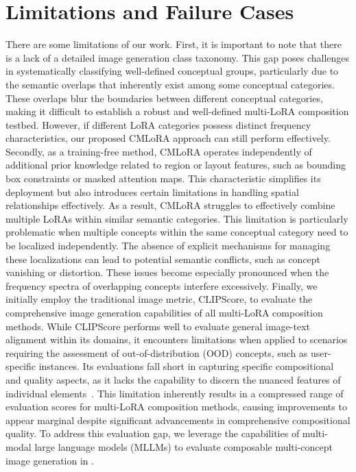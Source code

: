 \section{Limitations and Failure Cases}
\label{sec:limit}
There are some limitations of our work. First, it is important to note that there is a lack of a detailed image generation class taxonomy. This gap poses challenges in systematically classifying well-defined conceptual groups, particularly due to the semantic overlaps that inherently exist among some conceptual categories. These overlaps blur the boundaries between different conceptual categories, making it difficult to establish a robust and well-defined multi-LoRA composition testbed. However, if different LoRA categories possess distinct frequency characteristics, our proposed CMLoRA approach can still perform effectively.
Secondly, as a training-free method, CMLoRA operates independently of additional prior knowledge related to region or layout features, such as bounding box constraints or masked attention maps. This characteristic simplifies its deployment but also introduces certain limitations in handling spatial relationships effectively. As a result, CMLoRA struggles to effectively combine multiple LoRAs within similar semantic categories. This limitation is particularly problematic when multiple concepts within the same conceptual category need to be localized independently. The absence of explicit mechanisms for managing these localizations can lead to potential semantic conflicts, such as concept vanishing or distortion. These issues become especially pronounced when the frequency spectra of overlapping concepts interfere excessively.
Finally, we initially employ the traditional image metric, CLIPScore, to evaluate the comprehensive image generation capabilities of all multi-LoRA composition methods. While CLIPScore performs well to evaluate general image-text alignment within its domains, it encounters limitations when applied to scenarios requiring the assessment of out-of-distribution (OOD) concepts, such as user-specific instances. Its evaluations fall short in capturing specific compositional and quality aspects, as it lacks the capability to discern the nuanced features of individual elements~\citep{multilora}. This limitation inherently results in a compressed range of evaluation scores for multi-LoRA composition methods, causing improvements to appear marginal despite significant advancements in comprehensive compositional quality. To address this evaluation gap, we leverage the capabilities of multi-modal large language models (MLLMs) to evaluate composable multi-concept image generation in .

